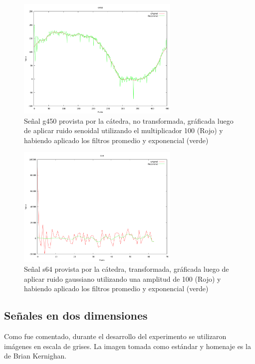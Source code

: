 \begin{figure}
\begin {center}
\includegraphics[width=220pt]{../matlab/g450-sin100-both.png}
\end {center}
\caption{Se\~nal g450 provista por la c\'atedra, no transformada, gr\'aficada
luego de aplicar ruido senoidal utilizando el multiplicador 100 (Rojo) y 
habiendo aplicado los filtros promedio y exponencial (verde)}
\label{fig:SinProm}
\end{figure}

\begin{figure}
\begin {center}
\includegraphics[width=220pt]{../matlab/s64-gauss100-both-spec.png}
\end {center}
\caption{Se\~nal s64 provista por la c\'atedra, transformada, gr\'aficada
luego de aplicar ruido gaussiano utilizando una amplitud de 100 (Rojo) y 
habiendo aplicado los filtros promedio y exponencial (verde)}
\label{fig:SinProm}
\end{figure}


\subsection{Se\~nales en dos dimensiones}

Como fue comentado, durante el desarrollo del experimento se utilizaron
im\'agenes en escala de grises. La imagen tomada como est\'andar y homenaje es 
la de Brian Kernighan.

